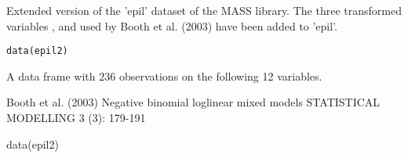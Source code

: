 \begin{Description}\relax
Extended version of the 'epil' dataset of the MASS library. 
The three transformed variables ,  and  used
by Booth et al. (2003) have been added to 'epil'.
\end{Description}
\begin{Usage}
\begin{verbatim}data(epil2)\end{verbatim}
\end{Usage}
\begin{Format}\relax
A data frame with 236 observations on the following 12 variables.
\end{Format}
\begin{References}\relax
Booth et al. (2003) Negative binomial loglinear mixed models 
STATISTICAL MODELLING 3 (3): 179-191
\end{References}
\begin{Examples}
\begin{ExampleCode}
data(epil2)
\end{ExampleCode}
\end{Examples}

